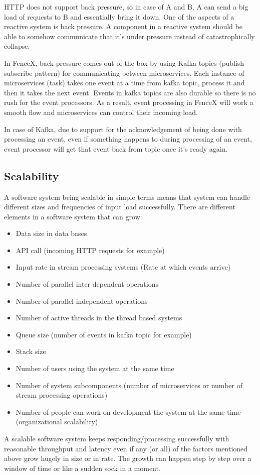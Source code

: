\documentclass[a4]{report}
\begin{document}
    HTTP does not support back pressure, so in case of A and B, A can send a big load of requests to B and
    essentially bring it down.
    One of the aspects of a reactive system is back pressure.
    A component in a reactive system should be able to somehow communicate that it's under pressure instead of
    catastrophically collapse.

    In FenceX, back pressure comes out of the box by using Kafka topics (publish subscribe pattern) for communicating
    between microservices.
    Each instance of microservices (task) takes one event at a time from kafka topic, process it and then it takes
    the next event.
    Events in kafka topics are also durable so there is no rush for the event processors.
    As a result, event processing in FenceX will work a smooth flow and microservices can control their incoming load.

    In case of Kafka, due to support for the acknowledgement of being done with processing an event, even if
    something happens to during processing of an event, event processor will get that event back from topic once it's
    ready again.

    \subsection{Scalability}
    A software system being scalable in simple terms means that system can handle different sizes and frequencies of
    input load successfully.
    There are different elements in a software system that can grow:
    \begin{itemize}
        \item Data size in data bases
        \item API call (incoming HTTP requests for example)
        \item Input rate in stream processing systems (Rate at which events arrive)
        \item Number of parallel inter dependent operations
        \item Number of parallel independent operations
        \item Number of active threads in the thread based systems
        \item Queue size (number of events in kafka topic for example)
        \item Stack size
        \item Number of users using the system at the same time
        \item Number of system subcomponents (number of microservices or number of stream processing operations)
        \item Number of people can work on development the system at the same time (organizational scalability)
    \end{itemize}
    A scalable software system keeps responding/processing successfully with reasonable throughput and latency even if
    any (or all) of the factors mentioned above grow hugely in size or in rate.
    The growth can happen step by step over a window of time or like a sudden sock in a moment.
\end{document}
